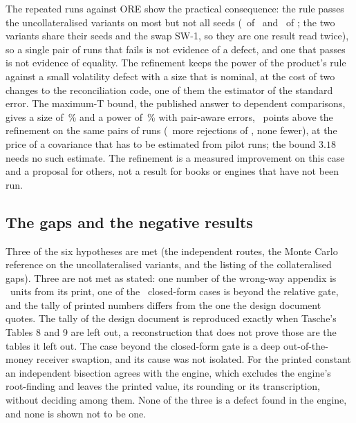The repeated runs against ORE show the practical consequence: the rule passes the uncollateralised variants on most but not all seeds (\nReplNetPass\ of \nReplNetN\ and \nReplSinPass\ of \nReplSinN; the two variants share their seeds and the swap SW-1, so they are one result read twice), so a single pair of runs that fails is not evidence of a defect, and one that passes is not evidence of equality. The refinement keeps the power of the product's rule against a small volatility defect with a size that is nominal, at the cost of two changes to the reconciliation code, one of them the estimator of the standard error. The maximum-T bound, the published answer to dependent comparisons, gives a size of \nSizePairMaxtNetting\,\% and a power of \nPowerPairMaxtSigmaTwo\,\% with pair-aware errors, \nMaxtGainNetting\ points above the refinement on the same pairs of runs (\nMaxtExtraNetting\ more rejections of \nMaxtPairedReps, none fewer), at the price of a covariance that has to be estimated from pilot runs; the bound $3.18$ needs no such estimate. The refinement is a measured improvement on this case and a proposal for others, not a result for books or engines that have not been run.

\subsection{The gaps and the negative results}
\label{sec:discussion-gaps}

Three of the six hypotheses are met (the independent routes, the Monte Carlo reference on the uncollateralised variants, and the listing of the collateralised gaps). Three are not met as stated: one number of the wrong-way appendix is \nWWAtwoUnits\ units from its print, one of the \nClosedCases\ closed-form cases is beyond the relative gate, and the tally of printed numbers differs from the one the design document quotes. The tally of the design document is reproduced exactly when Tasche's Tables 8 and 9 are left out, a reconstruction that does not prove those are the tables it left out. The case beyond the closed-form gate is a deep out-of-the-money receiver swaption, and its cause was not isolated. For the printed constant an independent bisection agrees with the engine, which excludes the engine's root-finding and leaves the printed value, its rounding or its transcription, without deciding among them. None of the three is a defect found in the engine, and none is shown not to be one.

